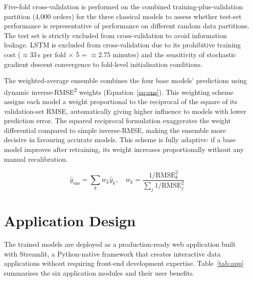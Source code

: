 Five-fold cross-validation is performed on the combined training-plus-validation partition (4{,}000 orders) for the three classical models to assess whether test-set performance is representative of performance on different random data partitions. The test set is strictly excluded from cross-validation to avoid information leakage. LSTM is excluded from cross-validation due to its prohibitive training cost ($\approx$33\,s per fold $\times$ 5 = $\approx$2.75 minutes) and the sensitivity of stochastic gradient descent convergence to fold-level initialisation conditions.

The weighted-average ensemble combines the four base models' predictions using dynamic inverse-RMSE\textsuperscript{2} weights (Equation~\ref{eq:ens}). This weighting scheme assigns each model a weight proportional to the reciprocal of the square of its validation-set RMSE, automatically giving higher influence to models with lower prediction error. The squared reciprocal formulation exaggerates the weight differential compared to simple inverse-RMSE, making the ensemble more decisive in favouring accurate models. This scheme is fully adaptive: if a base model improves after retraining, its weight increases proportionally without any manual recalibration.

\begin{mdframed}[style=eqbox]
\begin{equation}\hat{y}_{\text{ens}}=\sum_{k}w_k\hat{y}_k,\quad w_k=\frac{1/\text{RMSE}_k^2}{\sum_j 1/\text{RMSE}_j^2}\label{eq:ens}\end{equation}
\end{mdframed}

\secdiv
\section{Application Design}
The trained models are deployed as a production-ready web application built with Streamlit, a Python-native framework that creates interactive data applications without requiring front-end development expertise. Table~\ref{tab:app} summarises the six application modules and their user benefits.

